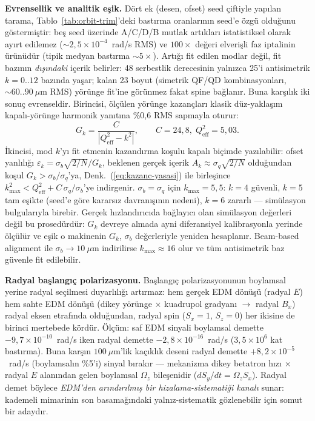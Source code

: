 \documentclass[preprint,12pt]{elsarticle}
\begin{document}
\textbf{Evrensellik ve analitik eşik.}
Dört ek (desen, ofset) seed çiftiyle yapılan tarama,
Tablo~\ref{tab:orbit-trim}'deki bastırma oranlarının seed'e özgü
olduğunu göstermiştir: beş seed üzerinde A/C/D/B mutlak artıkları
istatistiksel olarak ayırt edilemez ($\sim2{,}5\times10^{-4}$~rad/s
RMS) ve $100\times$ değeri elverişli faz iptalinin ürünüdür (tipik
medyan bastırma $\sim5\times$). Artığı fit edilen modlar değil, fit
bazının \emph{dışındaki} içerik belirler: 48 serbestlik derecesinin
yalnızca 25'i antisimetrik $k=0..12$ bazında yaşar; kalan 23 boyut
(simetrik QF/QD kombinasyonları, $\sim60..90~\mu$m RMS) yörünge
fit'ine görünmez fakat spine bağlanır. Buna karşılık iki sonuç
evrenseldir. Birincisi, ölçülen yörünge kazançları klasik
düz-yaklaşım kapalı-yörünge harmonik yanıtına \%0{,}6 RMS sapmayla
oturur:
\begin{equation}
G_k=\frac{C}{|Q_\mathrm{eff}^2-k^2|},\qquad C=24{,}8,\;
Q_\mathrm{eff}^2=5{,}03.
\label{eq:kazanc-yasasi}
\end{equation}
İkincisi, mod $k$'yı fit etmenin kazandırma koşulu kapalı biçimde
yazılabilir: ofset yanlılığı
$\varepsilon_k=\sigma_b\sqrt{2/N}/G_k$, beklenen gerçek içerik
$A_k\approx\sigma_q\sqrt{2/N}$ olduğundan koşul
$G_k>\sigma_b/\sigma_q$'ya, Denk.~(\ref{eq:kazanc-yasasi}) ile
birleşince $k_\mathrm{max}^2<Q_\mathrm{eff}^2+C\,\sigma_q/\sigma_b$'ye
indirgenir. $\sigma_b=\sigma_q$ için $k_\mathrm{max}=5{,}5$: $k=4$
güvenli, $k=5$ tam eşikte (seed'e göre kararsız davranışının nedeni),
$k=6$ zararlı — simülasyon bulgularıyla birebir. Gerçek hızlandırıcıda
bağlayıcı olan simülasyon değerleri değil bu prosedürdür: $G_k$
devreye almada ayni diferansiyel kalibrasyonla yerinde ölçülür ve eşik
o makinenin $G_k$, $\sigma_b$ değerleriyle yeniden hesaplanır.
Beam-based alignment ile $\sigma_b\to10~\mu$m indirilirse
$k_\mathrm{max}\approx16$ olur ve tüm antisimetrik baz güvenle fit
edilebilir.

\textbf{Radyal başlangıç polarizasyonu.}
Başlangıç polarizasyonunun boylamsal yerine radyal seçilmesi
duyarlılığı artırmaz: hem ger\c{c}ek EDM dönüşü (radyal $E$) hem sahte
EDM dönüşü (dikey yörünge $\times$ kuadrupol gradyanı $\to$ radyal
$B_x$) radyal eksen etrafında olduğundan, radyal spin
($S_x=1$, $S_z=0$) her ikisine de birinci mertebede kördür. Ölçüm:
saf EDM sinyali boylamsal demette $-9{,}7\times10^{-10}$~rad/s iken
radyal demette $-2{,}8\times10^{-16}$~rad/s ($3{,}5\times10^{6}$ kat
bastırma). Buna karşın $100~\mu$m'lik kaçıklık deseni radyal demette
$+8{,}2\times10^{-5}$~rad/s (boylamsalın \%5'i) sinyal bırakır —
mekanizma dikey betatron hızı $\times$ radyal $E$ alanından gelen
boylamsal $\Omega_z$ bileşenidir ($dS_y/dt=\Omega_z S_x$). Radyal
demet böylece \emph{EDM'den arındırılmış bir hizalama-sistematiği
kanalı} sunar: kademeli mimarinin son basamağındaki
yalnız-sistematik gözlenebilir için somut bir adaydır.
\end{document}
